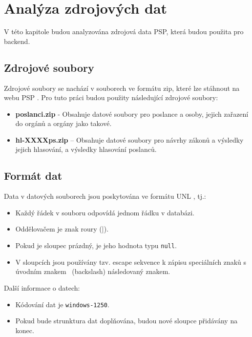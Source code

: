 \chapter{Analýza zdrojových dat}
\label{ch:analysis_data}

\begin{chapterabstract}
	V této kapitole budou analyzována zdrojová data PSP, která budou použita pro backend.
\end{chapterabstract}

\section{Zdrojové soubory}
\label{sec:source-data}

Zdrojové soubory se nachází v souborech ve formátu zip, které lze stáhnout na webu PSP \cite{psp-data}. Pro tuto práci budou použity následující zdrojové soubory:

\begin{itemize}
	\item \textbf{poslanci.zip} - Obsahuje datové soubory pro poslance a osoby, jejich zařazení do orgánů \linebreak a orgány jako takové.
	\item \textbf{hl-XXXXps.zip} -- Obsahuje datové soubory pro návrhy zákonů a výsledky jejich \linebreak hlasování, a výsledky hlasování poslanců.
\end{itemize}

\section{Formát dat}
Data v datových souborech jsou poskytována ve formátu UNL \cite{psp-data}, tj.:

\begin{itemize}
	\item Každý řádek v souboru odpovídá jednom řádku v databázi.
	\item Oddělovačem je znak roury (|).
	\item Pokud je sloupec prázdný, je jeho hodnota typu \lstinline|null|.
	\item V sloupcích jsou používány tzv. escape sekvence k zápisu speciálních znaků s úvodním znakem \ (backslash) následovaný znakem.
\end{itemize}

\noindent Další informace o datech:

\begin{itemize}
	\item Kódování dat je \lstinline|windows-1250|.
	\item Pokud bude strunktura dat doplňována, budou nové sloupce přidávány na konec.
\end{itemize}

